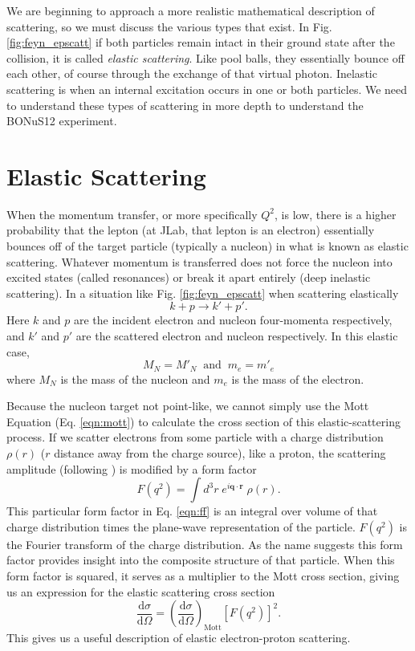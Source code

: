We are beginning to approach a more realistic mathematical description of scattering, so we must discuss the various types that exist. In Fig. \ref{fig:feyn_epscatt} if both particles remain intact in their ground state after the collision, it is called \textit{elastic scattering}. Like pool balls, they essentially bounce off each other, of course through the exchange of that virtual photon. Inelastic  scattering is when an internal excitation occurs in one or both particles. We need to understand these types of scattering in more depth to understand the BONuS12 experiment.

\section{Elastic Scattering}
When the momentum transfer, or more specifically $Q^2$, is low, there is a higher probability that the lepton (at JLab, that lepton is an electron) essentially bounces off of the target particle (typically a nucleon) in what is known as elastic scattering. Whatever momentum is transferred does not force the nucleon into excited states (called resonances) or break it apart entirely (deep inelastic scattering). In a situation like Fig. \ref{fig:feyn_epscatt} when scattering elastically
\begin{equation}
k+p \longrightarrow k' + p'.
\end{equation}
Here $k$ and $p$ are the incident electron and nucleon four-momenta respectively, and $k'$ and $p'$ are the scattered electron and nucleon respectively. In this elastic case,
\begin{equation}
M_N = M'_N \; \; \mathrm{and} \; \; m_e = m'_e
\end{equation}
where $M_N$ is the mass of the nucleon and $m_e$ is the mass of the electron. 

Because the nucleon target not point-like, we cannot simply use the Mott Equation (Eq. \ref{eqn:mott}) to calculate the cross section of this elastic-scattering process. If we scatter electrons from some particle with a charge distribution $\rho(r)$ ($r$ distance away from the charge source), like a proton, the scattering amplitude (following \cite{book:halzen}) is modified by a form factor
\begin{equation}
\label{eqn:ff}
F(q^2) = \int d^3r \; e^{i\mathbf{q} \cdot \mathbf{r}} \; \rho(r).
\end{equation}
This particular form factor in Eq. \ref{eqn:ff} is an integral over volume of that charge distribution times the plane-wave representation of the particle. $F(q^2)$ is the Fourier transform of the charge distribution. As the name suggests this form factor provides insight into the composite structure of that particle. When this form factor is squared, it serves as a multiplier to the Mott cross section, giving us an expression for the elastic scattering cross section
\begin{equation}
\frac{\mathrm{d}\sigma}{\mathrm{d}\Omega} = \left( \frac{\mathrm{d}\sigma}{\mathrm{d}\Omega} \right)_{\mathrm{Mott}} [F(q^2)]^2.
\end{equation}
This gives us a useful description of elastic electron-proton scattering.

